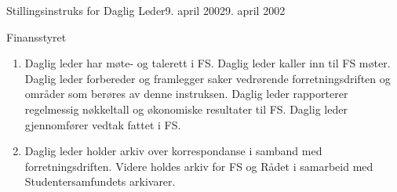 \begin{instruks}{Stillingsinstruks for Daglig Leder}{9. april 2002}{9. april 2002}
    \begin{instruksledd}{Finansstyret}
        \begin{enumerate}
            \item Daglig leder har møte- og talerett i FS. Daglig leder kaller inn til FS møter. Daglig leder 
                forbereder og framlegger saker vedrørende
                forretningsdriften og områder som berøres av denne instruksen. Daglig leder rapporterer regelmessig nøkkeltall og
                økonomiske resultater til FS. Daglig leder gjennomfører vedtak fattet i FS.
            \item Daglig leder holder arkiv over korrespondanse i samband med forretningsdriften. Videre holdes arkiv for FS og Rådet
                i samarbeid med Studentersamfundets arkivarer.
        \end{enumerate}
    \end{instruksledd}

\end{instruks}


